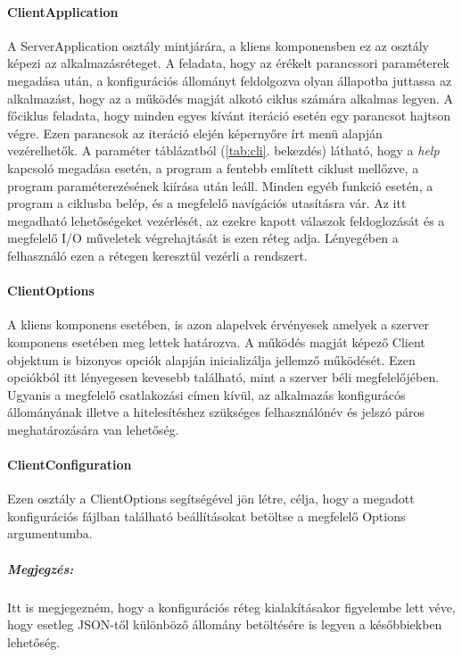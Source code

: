 \documentclass[12pt]{report}
\begin{document}
\paragraph{ClientApplication} 
A ServerApplication osztály mintjárára, a kliens komponensben ez az osztály képezi az alkalmazásréteget. A feladata, hogy az érékelt parancssori paraméterek megadása után, a konfigurációs állományt feldolgozva olyan állapotba juttassa az alkalmazást, hogy az a működés magját alkotó ciklus számára alkalmas legyen. A főciklus feladata, hogy minden egyes kívánt iteráció esetén egy parancsot hajtson végre. Ezen parancsok az iteráció elején képernyőre írt menü alapján vezérelhetők. A paraméter táblázatból (\ref{tab:cli}. bekezdés) látható, hogy a \textit{help} kapcsoló megadása esetén, a program a fentebb említett ciklust mellőzve, a program paraméterezésének kiírása után leáll. Minden egyéb funkció esetén, a program a ciklusba belép, és a megfelelő navígációs utasításra vár.
Az itt megadható lehetőségeket vezérlését, az ezekre kapott válaszok feldoglozását és a megfelelő I/O műveletek végrehajtását is ezen réteg adja. Lényegében a felhasználó ezen a rétegen keresztül vezérli a rendszert.
\paragraph{ClientOptions}

A kliens komponens esetében, is azon alapelvek érvényesek amelyek a szerver komponens esetében meg lettek határozva. A működés magját képező Client objektum is bizonyos opciók alapján inicializálja jellemző működését. Ezen opciókból itt lényegesen kevesebb található, mint a szerver béli megfelelőjében. Ugyanis  a megfelelő csatlakozási címen kívül, az alkalmazás konfigurácós állományának illetve a hitelesítéshez szükséges felhasználónév és jelszó páros meghatározására van lehetőség.
\paragraph{ClientConfiguration}
Ezen osztály a ClientOptions segítségével jön létre, célja, hogy a megadott konfigurációs fájlban található beállításokat betöltse a megfelelő Options argumentumba.
\subparagraph{Megjegzés:} 
Itt is megjegezném, hogy a konfigurációs réteg kialakításakor figyelembe lett véve, hogy esetleg JSON-től különböző állomány betöltésére is legyen a későbbiekben lehetőség.
\end{document}
